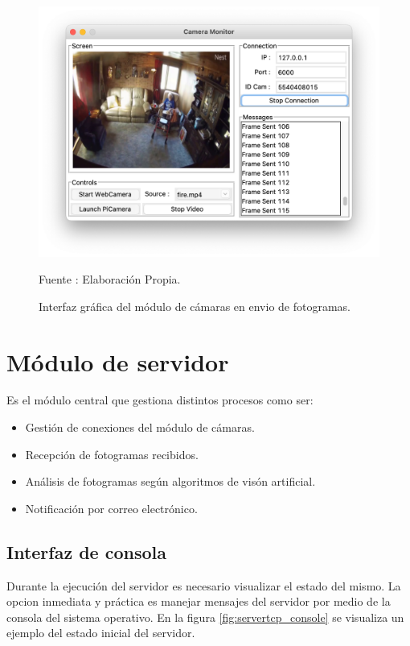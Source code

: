 \begin{figure}[H]
    \begin{center}
        \includegraphics[width=13cm]{img/capitulo_5/camera_working.png}
        \caption{Interfaz gráfica del módulo de cámaras en envio de fotogramas.}
        Fuente : Elaboración Propia.
        \label{fig:working_camera}
    \end{center}
\end{figure}


\section{Módulo de servidor}
Es el módulo central que gestiona distintos procesos como ser: 
\begin{itemize}
    \item Gestión de conexiones del módulo de cámaras.
    \item Recepción de fotogramas recibidos.
    \item Análisis de fotogramas según algoritmos de visón artificial.
    \item Notificación por correo electrónico.
\end{itemize}
\subsection{Interfaz de consola}
Durante la ejecución del servidor es necesario visualizar el estado del mismo. La opcion inmediata y práctica es manejar mensajes del servidor por medio de la consola del sistema operativo. En la figura \ref{fig:servertcp_console} se visualiza un ejemplo del estado inicial del servidor.\\


